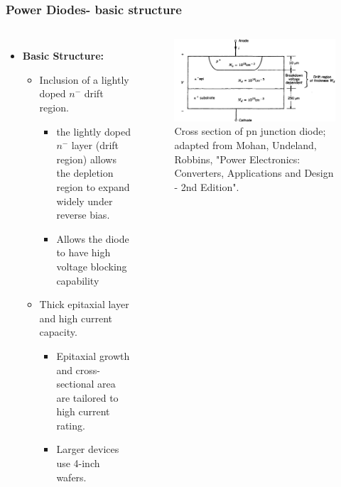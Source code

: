 \begin{frame}
    \frametitle{Power Diodes- basic structure}
    \begin{columns}
        \begin{itemize}
            \item \textbf{Basic Structure:}
            \begin{itemize}
                \item Inclusion of a lightly doped $n^-$ drift region.
                \begin{itemize}
                    \item the lightly doped $n^-$ layer (drift region) allows the depletion region to expand widely under reverse bias.
                    \item Allows the diode to have high voltage blocking capability
                \end{itemize}
                \item Thick epitaxial layer and high current capacity.
                \begin{itemize}
                    \item Epitaxial growth and cross-sectional area are tailored to high current rating.
                    \item Larger devices use 4-inch wafers.
                \end{itemize}
            \end{itemize}
        \end{itemize}

        \begin{figure}
            \centering
            \label{fig:Power_Diodes_structure_and_IV_characteristics}
            \includegraphics[scale=0.2]{fig/lec04/cross_section_pn_junction.png}
            \caption{Cross section of pn junction diode; adapted from Mohan, Undeland, Robbins, "Power Electronics: Converters, Applications and Design - 2nd Edition".}
        \end{figure}
    \end{columns}
\end{frame}

